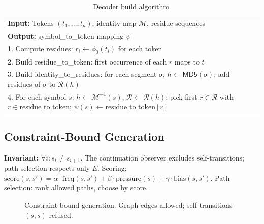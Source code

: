 \documentclass[10pt]{article}
\begin{document}
\begin{table}[t]
\centering
\caption{Decoder build algorithm.}
\label{tab:decoder}
\begin{tabular}{l}
\toprule
\textbf{Input:} Tokens $(t_1, \ldots, t_n)$, identity map $\mathcal{M}$, residue sequences\\
\textbf{Output:} symbol\_to\_token mapping $\psi$\\
\midrule
1. Compute residues: $r_i \gets \phi_0(t_i)$ for each token\\
2. Build residue\_to\_token: first occurrence of each $r$ maps to $t$\\
3. Build identity\_to\_residues: for each segment $\sigma$, $h \gets \mathsf{MD5}(\sigma)$; add residues of $\sigma$ to $\mathcal{R}(h)$\\
4. For each symbol $s$: $h \gets \mathcal{M}^{-1}(s)$, $\mathcal{R} \gets \mathcal{R}(h)$; pick first $r \in \mathcal{R}$ with $r \in \text{residue\_to\_token}$; $\psi(s) \gets \text{residue\_to\_token}[r]$\\
\bottomrule
\end{tabular}
\end{table}

\subsection{Constraint-Bound Generation}

\textbf{Invariant:} $\forall i: s_i \neq s_{i+1}$. The continuation observer excludes self-transitions; path selection respects only $E$. Scoring: $\text{score}(s, s') = \alpha \cdot \text{freq}(s, s') + \beta \cdot \text{pressure}(s) + \gamma \cdot \text{bias}(s, s')$. Path selection: rank allowed paths, choose by score.

\begin{figure}[t]
\centering
{}
\caption{Constraint-bound generation. Graph edges allowed; self-transitions $(s,s)$ refused.}
\label{fig:refusal}
\end{figure}
\end{document}
